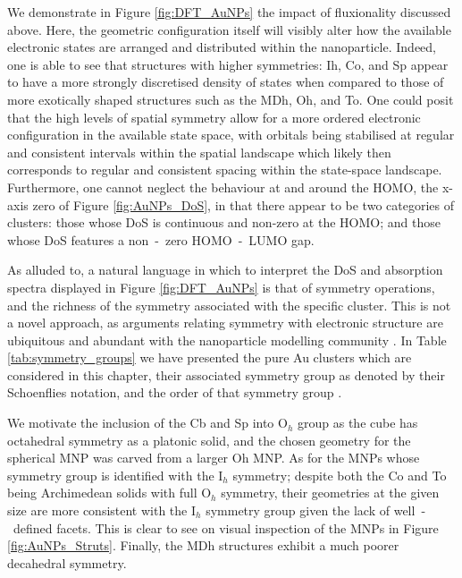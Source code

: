 We demonstrate in Figure \ref{fig:DFT_AuNPs} the impact of fluxionality discussed above. Here, the geometric configuration itself will visibly alter how the available electronic states are arranged and distributed within the nanoparticle. Indeed, one is able to see that structures with higher symmetries: Ih, Co, and Sp appear to have a more strongly discretised density of states when compared to those of more exotically shaped structures such as the MDh, Oh, and To. One could posit that the high levels of spatial symmetry allow for a more ordered electronic configuration in the available state space, with orbitals being stabilised at regular and consistent intervals within the spatial landscape which likely then corresponds to regular and consistent spacing within the state-space landscape. Furthermore, one cannot neglect the behaviour at and around the HOMO, the x-axis zero of Figure \ref{fig:AuNPs_DoS}, in that there appear to be two categories of clusters: those whose DoS is continuous and non-zero at the HOMO; and those whose DoS features a non~-~zero HOMO~-~LUMO gap.

As alluded to, a natural language in which to interpret the DoS and absorption spectra displayed in Figure \ref{fig:DFT_AuNPs} is that of symmetry operations, and the richness of the symmetry associated with the specific cluster. This is not a novel approach, as arguments relating symmetry with electronic structure are ubiquitous and abundant with the nanoparticle modelling community \cite{doi:10.1021/acs.jpca.8b07923,PhysRevB.84.035325,doi:10.1021/acs.jpcc.9b05863,C9NR08515G,PhysRevB.81.233407}. In Table \ref{tab:symmetry_groups} we have presented the pure Au clusters which are considered in this chapter, their associated symmetry group as denoted by their Schoenflies notation, and the order of that symmetry group \cite{jacobs_2005}. 

We motivate the inclusion of the Cb and Sp into O$_{h}$ group as the cube has octahedral symmetry as a platonic solid, and the chosen geometry for the spherical MNP was carved from a larger Oh MNP. As for the MNPs whose symmetry group is identified with the I$_{h}$ symmetry; despite both the Co and To being Archimedean solids with full O$_{h}$ symmetry, their geometries at the given size are more consistent with the I$_{h}$ symmetry group given the lack of well~-~defined facets. This is clear to see on visual inspection of the MNPs in Figure \ref{fig:AuNPs_Struts}. Finally, the MDh structures exhibit a much poorer decahedral symmetry.

